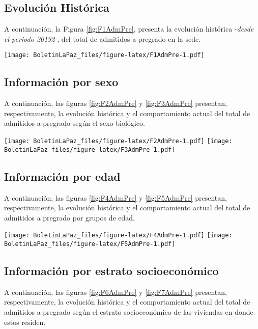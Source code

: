 \documentclass[
]{book}
\begin{document}
\hypertarget{evoluciuxf3n-histuxf3rica-1}{%
\subsection{Evolución Histórica}\label{evoluciuxf3n-histuxf3rica-1}}

A continuación, la Figura \ref{fig:F1AdmPre}, presenta la evolución histórica -\emph{desde el periodo 20192}-, del total de admitidos a pregrado en la sede.

\texttt{[image: BoletinLaPaz\_files/figure-latex/F1AdmPre-1.pdf]}

\hypertarget{informaciuxf3n-por-sexo-1}{%
\subsection{Información por sexo}\label{informaciuxf3n-por-sexo-1}}

A continuación, las figuras \ref{fig:F2AdmPre} y \ref{fig:F3AdmPre} presentan, respectivamente, la evolución histórica y el comportamiento actual del total de admitidos a pregrado según el sexo biológico.

\texttt{[image: BoletinLaPaz\_files/figure-latex/F2AdmPre-1.pdf]}
\texttt{[image: BoletinLaPaz\_files/figure-latex/F3AdmPre-1.pdf]}

\hypertarget{informaciuxf3n-por-edad-1}{%
\subsection{Información por edad}\label{informaciuxf3n-por-edad-1}}

A continuación, las figuras \ref{fig:F4AdmPre} y \ref{fig:F5AdmPre} presentan, respectivamente, la evolución histórica y el comportamiento actual del total de admitidos a pregrado por grupos de edad.

\texttt{[image: BoletinLaPaz\_files/figure-latex/F4AdmPre-1.pdf]}
\texttt{[image: BoletinLaPaz\_files/figure-latex/F5AdmPre-1.pdf]}

\hypertarget{informaciuxf3n-por-estrato-socioeconuxf3mico-1}{%
\subsection{Información por estrato socioeconómico}\label{informaciuxf3n-por-estrato-socioeconuxf3mico-1}}

A continuación, las figuras \ref{fig:F6AdmPre} y \ref{fig:F7AdmPre} presentan, respectivamente, la evolución histórica y el comportamiento actual del total de admitidos a pregrado según el estrato socioeconómico de las viviendas en donde estos residen.
\end{document}
